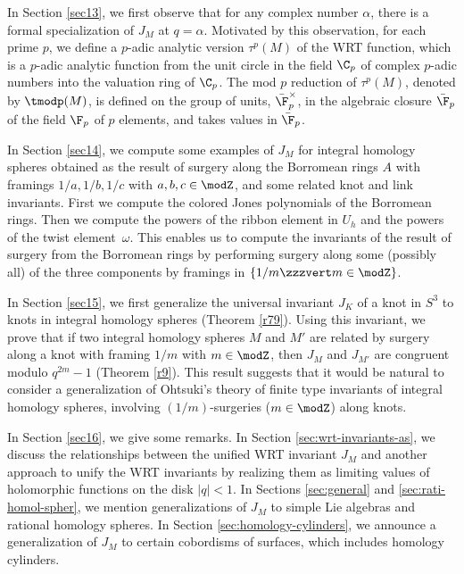 \documentclass{amsart}
\numberwithin{equation}{section}
\numberwithin{figure}{section}
\theoremstyle{plain}
\theoremstyle{definition}
\theoremstyle{remark}
\begin{document}
In Section \ref{sec13}, we first observe that for any complex number
$\alpha $, there is a formal specialization of $J_M$ at $q=\alpha $.  Motivated
by this observation, for each prime $p$, we define a $p$-adic analytic
version $\tau ^p(M)$ of the WRT function, which is
a $p$-adic analytic function from the unit circle in the field $\C_p$
of complex $p$-adic numbers into the valuation ring of $\C_p$.  The
mod $p$ reduction of $\tau ^p(M)$, denoted by $\tmodp(M)$, is defined
on the group of units, $\bar\F_p^\times $, in the algebraic closure
$\bar\F_p$ of the field $\F_p$ of $p$ elements, and takes values in
$\bar\F_p$.

In Section \ref{sec14}, we compute some examples of $J_M$ for integral
homology spheres obtained as the result of surgery along the Borromean
rings $A$ with framings $1/a,1/b,1/c$ with $a,b,c\in \modZ $, and some
related knot and link invariants.  First we compute the colored Jones
polynomials of the Borromean rings.  Then we compute the powers of the
ribbon element in $U_h$ and the powers of the twist element~$\omega $.
This enables us to compute the invariants of the result of surgery
from the Borromean rings by performing surgery along some (possibly
all) of the three components by framings in $\{1/m\zzzvert m\in \modZ \}$.

In Section \ref{sec15}, we first generalize the universal invariant
$J_K$ of a knot in $S^3$ to knots in integral homology spheres
(Theorem \ref{r79}).  Using this invariant, we prove that if two
integral homology spheres $M$ and $M'$ are related by surgery along a
knot with framing $1/m$ with $m\in \modZ $, then $J_M$ and $J_{M'}$ are
congruent modulo $q^{2m}-1$ (Theorem \ref{r9}).  This result suggests
that it would be natural to consider a generalization of Ohtsuki's
theory of finite type invariants of integral homology spheres,
involving $(1/m)$-surgeries ($m\in \modZ $) along knots.

In Section \ref{sec16}, we give some remarks.  In Section
\ref{sec:wrt-invariants-as}, we discuss the relationships between the
unified WRT invariant $J_M$ and another approach to unify the WRT
invariants by realizing them as limiting values of holomorphic
functions on the disk $|q|<1$.  In Sections \ref{sec:general} and
\ref{sec:rati-homol-spher}, we mention generalizations of $J_M$ to
simple Lie algebras and rational homology spheres.  In Section
\ref{sec:homology-cylinders}, we announce a generalization of $J_M$ to
certain cobordisms of surfaces, which includes homology cylinders.
\end{document}
